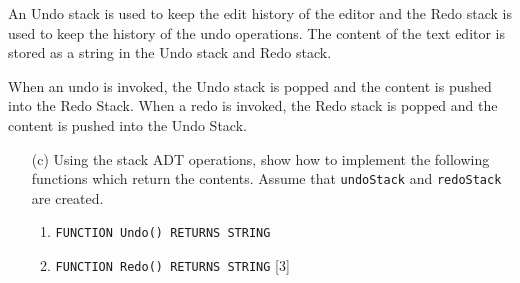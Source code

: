 An Undo stack is used to keep the edit history of the editor and the
Redo stack is used to keep the history of the undo operations. The
content of the text editor is stored as a string in the Undo stack
and Redo stack. 

When an undo is invoked, the Undo stack is popped and the content
is pushed into the Redo Stack. When a redo is invoked, the Redo stack
is popped and the content is pushed into the Undo Stack.
\begin{enumerate}
\item[(c)]  Using the stack ADT operations, show how to implement the following
functions which return the contents. Assume that \texttt{undoStack}
and \texttt{redoStack} are created. 
\begin{enumerate}
\item \texttt{FUNCTION Undo() RETURNS STRING} 
\item \texttt{FUNCTION Redo() RETURNS STRING}\hfill{} {[}3{]}
\end{enumerate}
\end{enumerate}